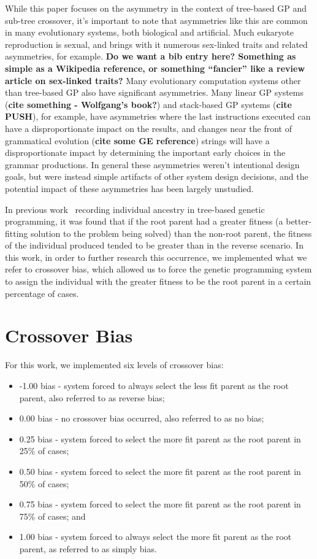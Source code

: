 \documentclass{sig-alternate}
\begin{document}
While this paper focuses on the asymmetry in the context of tree-based GP and sub-tree crossover, it's important to 
note that asymmetries like this are common in many evolutionary systems, both biological and artificial. Much 
eukaryote reproduction is sexual, and brings with it numerous sex-linked traits and related asymmetries, for example. 
\textbf{Do we want a bib entry here? Something as simple as a Wikipedia reference, or something ``fancier'' like a 
review article on sex-linked traits?} Many evolutionary computation systems other than tree-based GP also have 
significant asymmetries. Many linear GP systems (\textbf{cite something - Wolfgang's book?}) and stack-based GP 
systems (\textbf{cite PUSH}), for example, have asymmetries where the last instructions executed can have a 
disproportionate impact on the results, and changes near the front of grammatical evolution (\textbf{cite some GE 
reference}) strings will have a 
disproportionate impact by determining the important early choices in the grammar productions. In general these 
asymmetries weren't intentional design goals, but were instead simple artifacts of other system design decisions, and 
the potential impact of these asymmetries has been largely unstudied.

In previous work~\cite{McPheeDonatucciDramdahl:2014} recording individual ancestry in tree-based genetic 
programming,
it was found that if the root parent had a greater fitness (a better-fitting solution to the problem being solved) than
the non-root parent, the fitness of the individual produced tended to be greater than in the reverse scenario. In this
work, in order to further research this occurrence, we implemented what we refer to crossover bias, which allowed us to
force the genetic programming system to assign the individual with the greater fitness to be the root parent in a
certain percentage of cases.

\section{Crossover Bias} \label{sec:XObias}

For this work, we implemented six levels of crossover bias:
\begin{itemize}
\item -1.00 bias - system forced to always select the less fit parent as the root parent, also referred to as reverse
bias;
\item 0.00 bias - no crossover bias occurred, also referred to as no bias;
\item 0.25 bias - system forced to select the more fit parent as the root parent in 25\% of cases;
\item 0.50 bias - system forced to select the more fit parent as the root parent in 50\% of cases;
\item 0.75 bias - system forced to select the more fit parent as the root parent in 75\% of cases; and
\item 1.00 bias - system forced to always select the more fit parent as the root parent, as referred to as simply bias.
\end{itemize}
\end{document}
